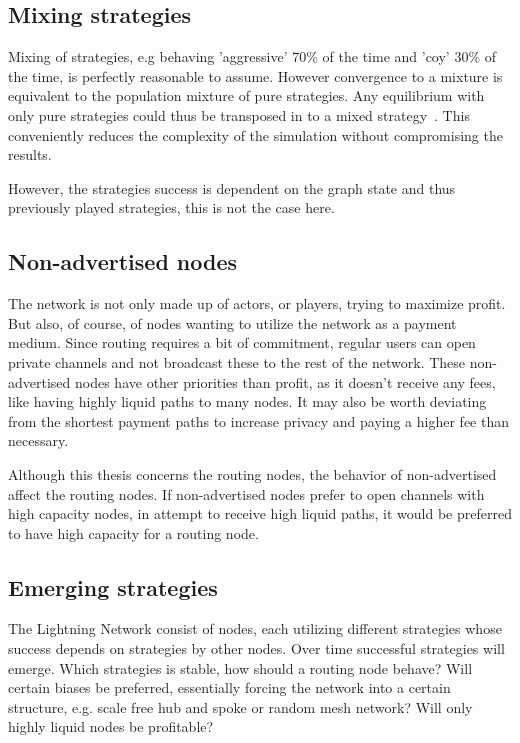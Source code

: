 \subsection{Mixing strategies}

Mixing of strategies, e.g behaving 'aggressive' 70\% of the time and 'coy' 30\% of the time, is perfectly reasonable to assume. However convergence to a mixture is equivalent to the population mixture of pure strategies. Any equilibrium with only pure strategies could thus be transposed in to a mixed strategy~\cite{easly:kleinberg:network:crowds:markets}. This conveniently reduces the complexity of the simulation without compromising the results. 

However, the strategies success is dependent on the graph state and thus previously played strategies, this is not the case here. 

\subsection{Non-advertised nodes}

The network is not only made up of actors, or players, trying to maximize profit. But also, of course, of nodes wanting to utilize the network as a payment medium. Since routing requires a bit of commitment, regular users can open private channels and not broadcast these to the rest of the network. These non-advertised nodes have other priorities than profit, as it doesn't receive any fees, like having highly liquid paths to many nodes. It may also be worth deviating from the shortest payment paths to increase privacy and paying a higher fee than necessary.

Although this thesis concerns the routing nodes, the behavior of non-advertised affect the routing nodes. If non-advertised nodes prefer to open channels with high capacity nodes, in attempt to receive high liquid paths, it would be preferred to have high capacity for a routing node.  

\subsection{Emerging strategies}

The \gls{Lightning Network} consist of nodes, each utilizing different strategies whose success depends on strategies by other nodes. Over time successful strategies will emerge. Which strategies is stable, how should a routing node behave? Will certain biases be preferred, essentially forcing the network into a certain structure, e.g. scale free hub and spoke or random mesh network? Will only highly liquid nodes be profitable?

